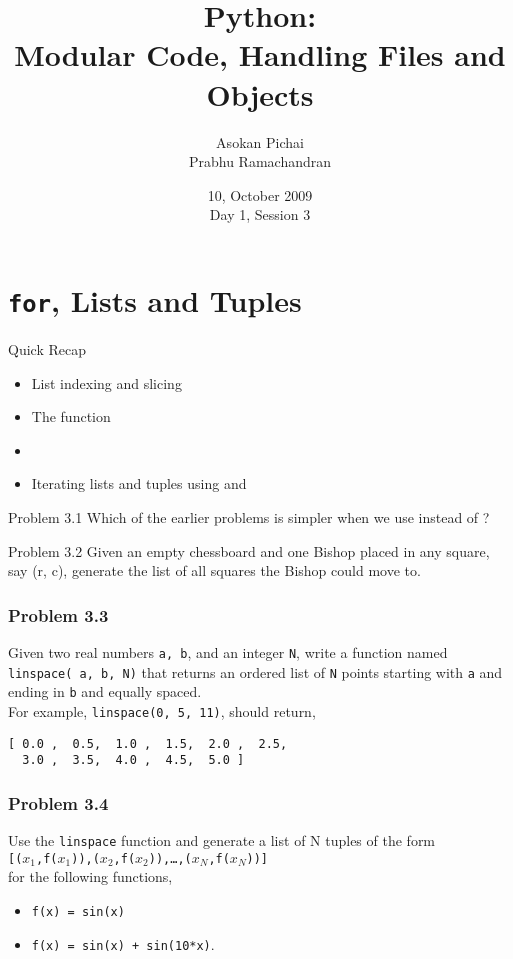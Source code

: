 \documentclass[14pt,compress]{beamer}
\title[Basic Python]{Python:\\Modular Code, Handling Files and Objects}
\author[FOSSEE Team] {Asokan Pichai\\Prabhu Ramachandran}
\institute[IIT Bombay] {Department of Aerospace Engineering\\IIT Bombay}
\date[] {10, October 2009\\Day 1, Session 3}
\newcommand{\typ}[1]{\texttt{#1}}
\newcommand{\kwrd}[1]{ \texttt{\textbf{\color{blue}{#1}}}  }
\begin{document}
\begin{frame}
  \titlepage
\end{frame}

\section{\typ{for}, Lists and Tuples}

\begin{frame}{Quick Recap}
  \begin{itemize}
    \item List indexing and slicing
    \item The \kwrd{range()} function
    \item \kwrd{for}
    \item Iterating lists and tuples using \kwrd{for} and \kwrd{range()}
  \end{itemize}
\end{frame}

\begin{frame}{Problem 3.1}
  Which of the earlier problems is simpler when we use \kwrd{for} instead of \kwrd{while}? 
\end{frame}

\begin{frame}{Problem 3.2}
  Given an empty chessboard and one Bishop placed in any square, say (r, c), generate the list of all squares the Bishop could move to.
\end{frame}

\begin{frame}[fragile]
  \frametitle{Problem 3.3}

  Given two real numbers \typ{a, b}, and an integer \typ{N}, write a
  function named \typ{linspace( a, b, N)} that returns an ordered list
  of \typ{N} points starting with \typ{a} and ending in \typ{b} and
  equally spaced.\\

  For example, \typ{linspace(0, 5, 11)}, should return, \\
\begin{lstlisting}
[ 0.0 ,  0.5,  1.0 ,  1.5,  2.0 ,  2.5,  
  3.0 ,  3.5,  4.0 ,  4.5,  5.0 ]
\end{lstlisting}
\end{frame}

\begin{frame}[fragile]
  \frametitle{Problem 3.4}

Use the \typ{linspace} function and generate a list of N tuples of the form\\
\typ{[($x_1$,f($x_1$)),($x_2$,f($x_2$)),\ldots,($x_N$,f($x_N$))]}\\for the following functions,\begin{itemize}
  \item \typ{f(x) = sin(x)}
  \item \typ{f(x) = sin(x) + sin(10*x)}.
\end{itemize}
\end{frame}
\end{document}
